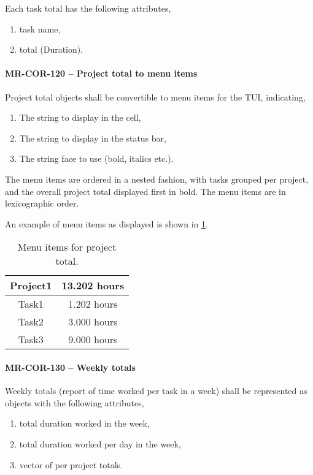Each task total has the following attributes,
\begin{enumerate}
\item task name,
\item total (Duration).
\end{enumerate}

\paragraph{MR-COR-120 -- Project total to menu items}
Project total objects shall be convertible to menu items for the TUI,
indicating,
\begin{enumerate}
\item The string to display in the cell,
\item The string to display in the status bar,
\item The string face to use (bold, italics etc.).
\end{enumerate}

The menu items are ordered in a nested fashion, with tasks grouped per
project, and the overall project total displayed first in bold.
The menu items are in lexicographic order.

An example of menu items as displayed is shown in
\cref{tab:project_total_menu_items}.

\begin{table} \caption{\label{tab:project_total_menu_items} Menu items for
    project total.}
  \begin{tabular}{| c | c |} \hline
    \textbf{Project1} & \textbf{13.202 hours} \\ \hline
    Task1 & 1.202 hours \\ \hline
    Task2 & 3.000 hours \\ \hline
    Task3 & 9.000 hours \\ \hline
  \end{tabular}
\end{table}

\paragraph{MR-COR-130 -- Weekly totals}
Weekly totals (report of time worked per task in a week) shall be represented
as objects with the following attributes,
\begin{enumerate}
\item total duration worked in the week,
\item total duration worked per day in the week,
\item vector of per project totals.
\end{enumerate}

